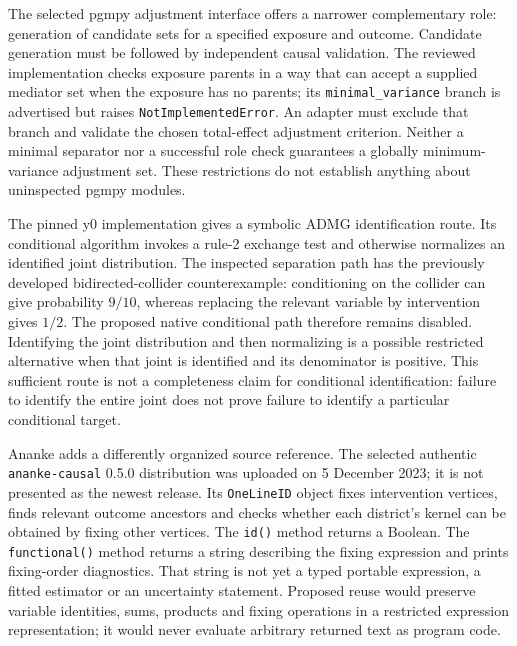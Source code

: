The selected pgmpy adjustment interface offers a narrower complementary role:
generation of candidate sets for a specified exposure and outcome. Candidate
generation must be followed by independent causal validation. The reviewed
implementation checks exposure parents in a way that can accept a supplied
mediator set when the exposure has no parents; its \texttt{minimal\_variance}
branch is advertised but raises \texttt{NotImplementedError}. An adapter must
exclude that branch and validate the chosen total-effect adjustment criterion.
Neither a minimal separator nor a successful role check guarantees a globally
minimum-variance adjustment set. These restrictions do not establish anything
about uninspected pgmpy modules.~\citep{exec13_pgmpy_reuse_primary}

The pinned y0 implementation gives a symbolic ADMG identification route.
Its conditional algorithm invokes a rule-2 exchange test and otherwise
normalizes an identified joint distribution. The inspected separation path has
the previously developed bidirected-collider counterexample: conditioning on
the collider can give probability $9/10$, whereas replacing the relevant
variable by intervention gives $1/2$. The proposed native conditional path
therefore remains disabled. Identifying the joint distribution and then
normalizing is a possible restricted alternative when that joint is identified
and its denominator is positive. This sufficient route is not a completeness
claim for conditional identification: failure to identify the entire joint
does not prove failure to identify a particular conditional target.
\citep{exec13_y0_id,exec13_y0_idc,exec13_y0_rule2,exec13_y0_separation,exec13_y0_oracles}

Ananke adds a differently organized source reference. The selected authentic
\texttt{ananke-causal} 0.5.0 distribution was uploaded on 5 December 2023; it is
not presented as the newest release. Its \texttt{OneLineID} object fixes
intervention vertices, finds relevant outcome ancestors and checks whether
each district's kernel can be obtained by fixing other vertices. The \texttt{id()}
method returns a Boolean. The \texttt{functional()} method returns a string
describing the fixing expression and prints fixing-order diagnostics. That
string is not yet a typed portable expression, a fitted estimator or an
uncertainty statement. Proposed reuse would preserve variable identities,
sums, products and fixing operations in a restricted expression representation;
it would never evaluate arbitrary returned text as program code.
\citep{exec18_pyid_one_line,exec18_pyid_contract}

